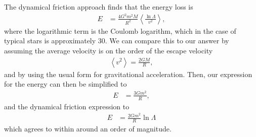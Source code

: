The dynamical friction approach \cite{dynamicalfriction} finds that the energy loss is
\begin{align*}
E &= \frac{4 G^2 m^2 M}{R^2} \left< \frac{\ln \Lambda}{v^2} \right>,
\end{align*}
where the logarithmic term is the Coulomb logarithm, which in the case of typical stars is approximately $30$. We can compare this to our answer by assuming the average velocity is on the order of the escape velocity
\begin{align*}
\left< v^2 \right> = \frac{2GM}{R},
\end{align*}
and by using the usual form for gravitational acceleration. Then, our expression for the energy can then be simplified to
\begin{align*}
E &= \frac{3Gm^2}{R},
\end{align*}
and the dynamical friction expression to
\begin{align*}
E &= \frac{2Gm^2}{R} \ln \Lambda
\end{align*}
which agrees to within around an order of magnitude.




%
















